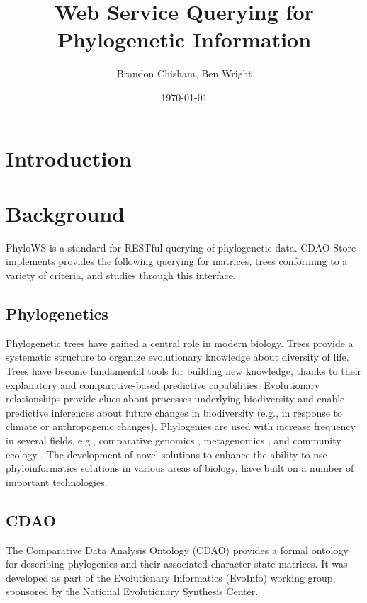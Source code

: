 \documentclass[10pt]{article}
\author{Brandon Chisham, Ben Wright}
\title{Web Service Querying for Phylogenetic Information}
\date{\today}
\begin{document}
\maketitle

\section{Introduction}

\section{Background}
PhyloWS is a standard for RESTful querying of phylogenetic data. CDAO-Store
implements provides the following querying for matrices, trees conforming to a
variety of criteria, and studies through this interface.

\subsection{Phylogenetics}
Phylogenetic trees have gained a central role in modern biology. Trees provide
a systematic structure to organize evolutionary knowledge about diversity of
life. Trees have become fundamental tools for building new knowledge, thanks to
their explanatory and comparative-based predictive capabilities.  Evolutionary
relationships provide clues about processes underlying biodiversity and enable
predictive inferences about future changes in biodiversity (e.g., in response
to climate or anthropogenic changes).  Phylogenies are used with increase
frequency in several fields, e.g., comparative genomics \cite{Ell08}, metagenomics \cite{WE08},
and community ecology \cite{WAMD02}.  The development of novel solutions to enhance the
ability to use phyloinformatics solutions in various areas of biology, have
built on a number of important technologies.

\subsection{CDAO}
The Comparative Data Analysis Ontology (CDAO) \cite{cdao-evol} provides a formal ontology
for describing phylogenies and their associated character state matrices.  It
was developed as part of the Evolutionary Informatics (EvoInfo) working group,
sponsored by the National Evolutionary Synthesis Center.
\end{document}
